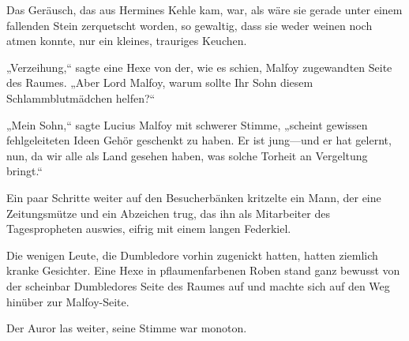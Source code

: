 Das Geräusch, das aus Hermines Kehle kam, war, als wäre sie gerade unter einem fallenden Stein zerquetscht worden, so gewaltig, dass sie weder weinen noch atmen konnte, nur ein kleines, trauriges Keuchen.

„Verzeihung,“ sagte eine Hexe von der, wie es schien, Malfoy zugewandten Seite des Raumes. „Aber Lord Malfoy, warum sollte Ihr Sohn diesem Schlammblutmädchen helfen?“

„Mein Sohn,“ sagte Lucius Malfoy mit schwerer Stimme, „scheint gewissen fehlgeleiteten Ideen Gehör geschenkt zu haben. Er ist jung—und er hat gelernt, nun, da wir alle als Land gesehen haben, was solche Torheit an Vergeltung bringt.“

Ein paar Schritte weiter auf den Besucherbänken kritzelte ein Mann, der eine Zeitungsmütze und ein Abzeichen trug, das ihn als Mitarbeiter des Tagespropheten auswies, eifrig mit einem langen Federkiel.

Die wenigen Leute, die Dumbledore vorhin zugenickt hatten, hatten ziemlich kranke Gesichter. Eine Hexe in pflaumenfarbenen Roben stand ganz bewusst von der scheinbar Dumbledores Seite des Raumes auf und machte sich auf den Weg hinüber zur Malfoy-Seite.

Der Auror las weiter, seine Stimme war monoton.


